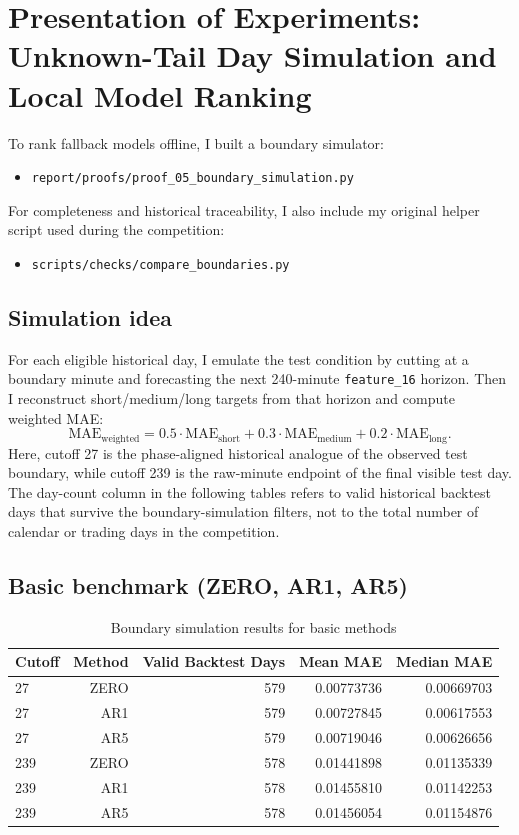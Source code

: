 \section{Presentation of Experiments: Unknown-Tail Day Simulation and Local Model Ranking}

To rank fallback models offline, I built a boundary simulator:
\begin{itemize}[leftmargin=1.5em]
  \item \texttt{report/proofs/proof\_05\_boundary\_simulation.py}
\end{itemize}
For completeness and historical traceability, I also include my original helper script used during the competition:
\begin{itemize}[leftmargin=1.5em]
  \item \texttt{scripts/checks/compare\_boundaries.py}
\end{itemize}

\subsection{Simulation idea}
For each eligible historical day, I emulate the test condition by cutting at a boundary minute and forecasting the next 240-minute \texttt{feature\_16} horizon. Then I reconstruct short/medium/long targets from that horizon and compute weighted MAE:
\begin{equation}
\text{MAE}_{\text{weighted}} = 0.5\cdot\text{MAE}_{\text{short}} + 0.3\cdot\text{MAE}_{\text{medium}} + 0.2\cdot\text{MAE}_{\text{long}}.
\end{equation}
Here, cutoff 27 is the phase-aligned historical analogue of the observed test boundary, while cutoff 239 is the raw-minute endpoint of the final visible test day.
The day-count column in the following tables refers to valid historical backtest days that survive the boundary-simulation filters, not to the total number of calendar or trading days in the competition.

\subsection{Basic benchmark (ZERO, AR1, AR5)}
\begin{table}[h]
\centering
\caption{Boundary simulation results for basic methods}
\begin{tabular}{lrrrr}
\toprule
Cutoff & Method & Valid Backtest Days & Mean MAE & Median MAE \\
\midrule
27  & ZERO & 579 & 0.00773736 & 0.00669703 \\
27  & AR1  & 579 & 0.00727845 & 0.00617553 \\
27  & AR5  & 579 & 0.00719046 & 0.00626656 \\
239 & ZERO & 578 & 0.01441898 & 0.01135339 \\
239 & AR1  & 578 & 0.01455810 & 0.01142253 \\
239 & AR5  & 578 & 0.01456054 & 0.01154876 \\
\bottomrule
\end{tabular}
\end{table}


